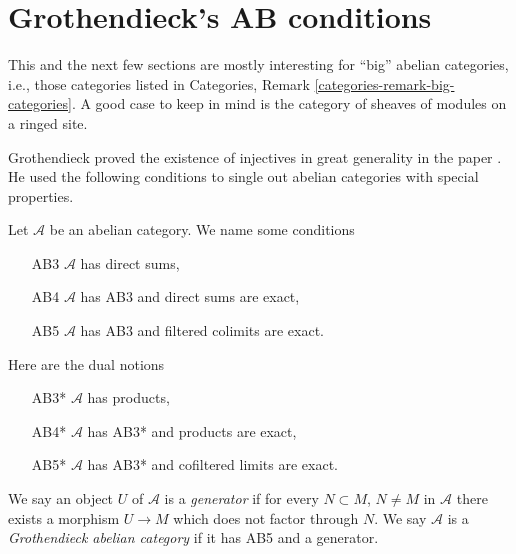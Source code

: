 \section{Grothendieck's AB conditions}
\label{section-grothendieck-conditions}

\noindent
This and the next few sections are mostly interesting for ``big'' abelian
categories, i.e., those categories listed in
Categories, Remark \ref{categories-remark-big-categories}.
A good case to keep in mind is the category of sheaves of modules
on a ringed site.

\medskip\noindent
Grothendieck proved the existence of injectives in great generality
in the paper \cite{Tohoku}. He used the following conditions to single
out abelian categories with special properties.

\begin{definition}
\label{definition-grothendieck-conditions}
Let $\mathcal{A}$ be an abelian category. We name some conditions
\begin{enumerate}
\item[AB3] $\mathcal{A}$ has direct sums,
\item[AB4] $\mathcal{A}$ has AB3 and direct sums are exact,
\item[AB5] $\mathcal{A}$ has AB3 and filtered colimits are exact.
\end{enumerate}
Here are the dual notions
\begin{enumerate}
\item[AB3*] $\mathcal{A}$ has products,
\item[AB4*] $\mathcal{A}$ has AB3* and products are exact,
\item[AB5*] $\mathcal{A}$ has AB3* and cofiltered limits are exact.
\end{enumerate}
We say an object $U$ of $\mathcal{A}$ is a {\it generator} if
for every $N \subset M$, $N \not = M$ in $\mathcal{A}$ there exists a morphism
$U \to M$ which does not factor through $N$.
We say $\mathcal{A}$ is a {\it Grothendieck abelian category} if
it has AB5 and a generator.
\end{definition}

